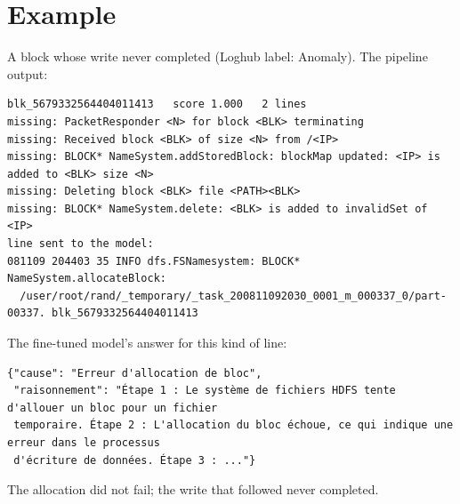 \documentclass[11pt,a4paper]{article}
\begin{document}
\section{Example}
A block whose write never completed (Loghub label: Anomaly). The pipeline output:
\begin{lstlisting}
blk_5679332564404011413   score 1.000   2 lines
missing: PacketResponder <N> for block <BLK> terminating
missing: Received block <BLK> of size <N> from /<IP>
missing: BLOCK* NameSystem.addStoredBlock: blockMap updated: <IP> is added to <BLK> size <N>
missing: Deleting block <BLK> file <PATH><BLK>
missing: BLOCK* NameSystem.delete: <BLK> is added to invalidSet of <IP>
line sent to the model:
081109 204403 35 INFO dfs.FSNamesystem: BLOCK* NameSystem.allocateBlock:
  /user/root/rand/_temporary/_task_200811092030_0001_m_000337_0/part-00337. blk_5679332564404011413
\end{lstlisting}
The fine-tuned model's answer for this kind of line:
\begin{lstlisting}
{"cause": "Erreur d'allocation de bloc",
 "raisonnement": "Étape 1 : Le système de fichiers HDFS tente d'allouer un bloc pour un fichier
 temporaire. Étape 2 : L'allocation du bloc échoue, ce qui indique une erreur dans le processus
 d'écriture de données. Étape 3 : ..."}
\end{lstlisting}
The allocation did not fail; the write that followed never completed.
\end{document}
